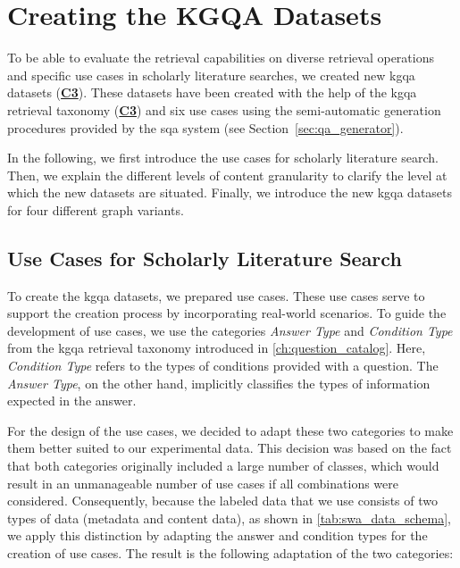 
\section{Creating the KGQA Datasets}
\label{sec:implementation_qa_dataset_generation}

To be able to evaluate the retrieval capabilities on diverse retrieval operations and specific use cases in scholarly literature searches, we created new \gls{kgqa} datasets (\hyperref[enum:c3]{\textbf{C3}}). These datasets have been created with the help of the \gls{kgqa} retrieval taxonomy (\hyperref[enum:c3]{\textbf{C3}}) and six use cases using the semi-automatic generation procedures provided by the \gls{sqa} system (see Section~\ref{sec:qa_generator}).

In the following, we first introduce the use cases for scholarly literature search. Then, we explain the different levels of content granularity to clarify the level at which the new datasets are situated. Finally, we introduce the new \gls{kgqa} datasets for four different graph variants.

\subsection{Use Cases for Scholarly Literature Search}
\label{sec:qa_use_cases}

To create the \gls{kgqa} datasets, we prepared use cases. These use cases serve to support the creation process by incorporating real-world scenarios. To guide the development of use cases, we use the categories \emph{Answer Type} and \emph{Condition Type} from the \gls{kgqa} retrieval taxonomy introduced in \autoref{ch:question_catalog}. Here, \emph{Condition Type} refers to the types of conditions provided with a question. The \emph{Answer Type}, on the other hand, implicitly classifies the types of information expected in the answer.

For the design of the use cases, we decided to adapt these two categories to make them better suited to our experimental data. This decision was based on the fact that both categories originally included a large number of classes, which would result in an unmanageable number of use cases if all combinations were considered. Consequently, because the labeled data that we use consists of two types of data (metadata and content data), as shown in \autoref{tab:swa_data_schema}, we apply this distinction by adapting the answer and condition types for the creation of use cases. The result is the following adaptation of the two categories:

